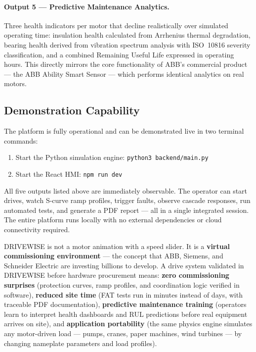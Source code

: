 \documentclass[9pt,a4paper,twocolumn,twoside]{tau-class/tau}
\begin{document}
\paragraph{Output 5 — Predictive Maintenance Analytics.}
Three health indicators per motor that decline realistically over simulated operating time: insulation health calculated from Arrhenius thermal degradation, bearing health derived from vibration spectrum analysis with ISO~10816 severity classification, and a combined Remaining Useful Life expressed in operating hours. This directly mirrors the core functionality of ABB's commercial product — the ABB Ability Smart Sensor — which performs identical analytics on real motors.

\subsection{Demonstration Capability}

The platform is fully operational and can be demonstrated live in two terminal commands:

\begin{enumerate}
    \item Start the Python simulation engine: \texttt{python3 backend/main.py}
    \item Start the React HMI: \texttt{npm run dev}
\end{enumerate}

All five outputs listed above are immediately observable. The operator can start drives, watch S-curve ramp profiles, trigger faults, observe cascade responses, run automated tests, and generate a PDF report — all in a single integrated session. The entire platform runs locally with no external dependencies or cloud connectivity required.

\begin{tauenv}[frametitle=Why DRIVEWISE Matters — The Industrial Perspective]
DRIVEWISE is not a motor animation with a speed slider. It is a \textbf{virtual commissioning environment} — the concept that ABB, Siemens, and Schneider Electric are investing billions to develop. A drive system validated in DRIVEWISE before hardware procurement means: \textbf{zero commissioning surprises} (protection curves, ramp profiles, and coordination logic verified in software), \textbf{reduced site time} (FAT tests run in minutes instead of days, with traceable PDF documentation), \textbf{predictive maintenance training} (operators learn to interpret health dashboards and RUL predictions before real equipment arrives on site), and \textbf{application portability} (the same physics engine simulates any motor-driven load — pumps, cranes, paper machines, wind turbines — by changing nameplate parameters and load profiles).
\end{tauenv}
\end{document}
